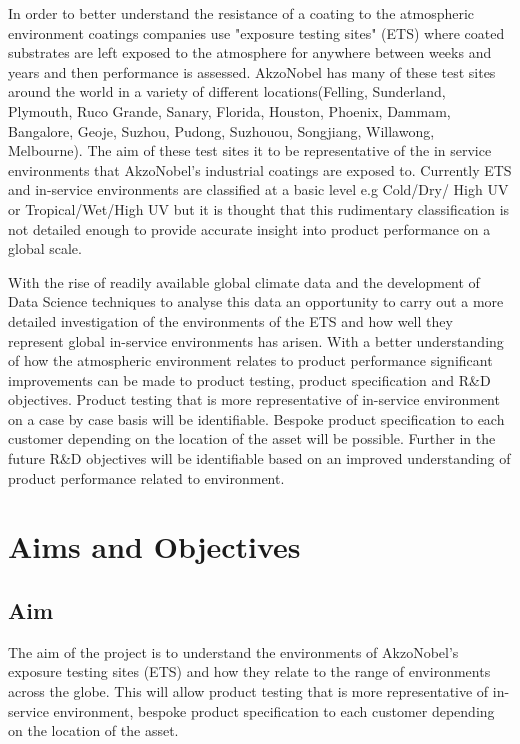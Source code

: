 \documentclass{article}
\begin{document}
In order to better understand the resistance of a coating to the atmospheric environment coatings companies use "exposure testing sites" (ETS) where coated substrates are left exposed to the atmosphere for anywhere between weeks and years and then performance is assessed. AkzoNobel has many of these test sites around the world in a variety of different locations(Felling, Sunderland, Plymouth, Ruco Grande, Sanary, Florida, Houston, Phoenix, Dammam, Bangalore, Geoje, Suzhou, Pudong, Suzhouou, Songjiang, Willawong, Melbourne). The aim of these test sites it to be representative of the in service environments that AkzoNobel's industrial coatings are exposed to. Currently ETS and in-service environments are classified at a basic level e.g Cold/Dry/ High UV or Tropical/Wet/High UV but it is thought that this rudimentary classification is not detailed enough to provide accurate insight into product performance on a global scale. 

With the rise of readily available global climate data and the development of Data Science techniques to analyse this data an opportunity to carry out a more detailed investigation of the environments of the ETS and how well they represent global in-service environments has arisen. With a better understanding of how the atmospheric environment relates to product performance significant improvements can be made to product testing, product specification and R\&D objectives. Product testing that is more representative of in-service environment on a case by case basis will be identifiable. Bespoke product specification to each customer depending on the location of the asset will be possible. Further in the future R\&D objectives will be identifiable based on an improved understanding of product performance related to environment.     

\section{Aims and Objectives}
\subsection{Aim}
The aim of the project is to understand the environments of AkzoNobel's exposure testing sites (ETS) and how they relate to the range of environments across the globe. This will allow product testing that is more representative of in-service environment, bespoke product specification to each customer depending on the location of the asset.   
\end{document}
